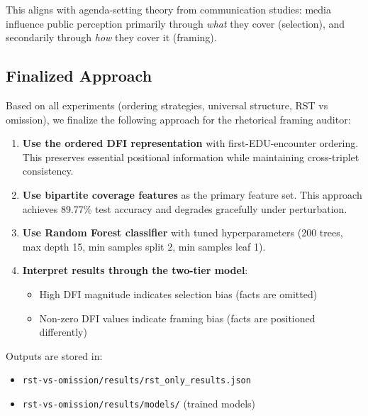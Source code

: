 \documentclass[12pt,a4paper]{article}
\begin{document}
This aligns with agenda-setting theory from communication studies: media influence public
perception primarily through \textit{what} they cover (selection), and secondarily through
\textit{how} they cover it (framing).

\subsection{Finalized Approach}

Based on all experiments (ordering strategies, universal structure, RST vs omission), we
finalize the following approach for the rhetorical framing auditor:

\begin{enumerate}
\item \textbf{Use the ordered DFI representation} with first-EDU-encounter ordering.
      This preserves essential positional information while maintaining cross-triplet consistency.

\item \textbf{Use bipartite coverage features} as the primary feature set.
      This approach achieves 89.77\% test accuracy and degrades gracefully under perturbation.

\item \textbf{Use Random Forest classifier} with tuned hyperparameters
      (200 trees, max depth 15, min samples split 2, min samples leaf 1).

\item \textbf{Interpret results through the two-tier model}:
      \begin{itemize}
      \item High DFI magnitude indicates selection bias (facts are omitted)
      \item Non-zero DFI values indicate framing bias (facts are positioned differently)
      \end{itemize}
\end{enumerate}

Outputs are stored in:
\begin{itemize}
\item \texttt{rst-vs-omission/results/rst\_only\_results.json}
\item \texttt{rst-vs-omission/results/models/} (trained models)
\end{itemize}
\end{document}
